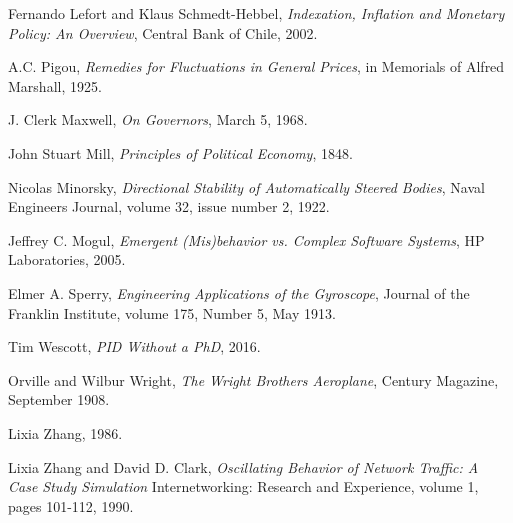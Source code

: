 \begin{thebibliography}{9}
    Fernando Lefort and Klaus Schmedt-Hebbel,
    \emph{Indexation, Inflation and Monetary Policy: An Overview},
    Central Bank of Chile,
    2002.

    A.C. Pigou,
    \emph{Remedies for Fluctuations in General Prices},
    in Memorials of Alfred Marshall,
    1925.

    J. Clerk Maxwell,
    \emph{On Governors},
    March 5, 1968.

    John Stuart Mill,
    \emph{Principles of Political Economy},
    1848.

    Nicolas Minorsky,
    \emph{Directional Stability of Automatically Steered Bodies},
    Naval Engineers Journal,
    volume 32,
    issue number 2,
    1922.

    Jeffrey C. Mogul,
    \emph{Emergent (Mis)behavior vs. Complex Software Systems},
    HP Laboratories,
    2005.

    Elmer A. Sperry,
    \emph{Engineering Applications of the Gyroscope},
    Journal of the Franklin Institute,
    volume 175,
    Number 5,
    May 1913.

    Tim Wescott,
    \emph{PID Without a PhD},
    2016.

    Orville and Wilbur Wright,
    \emph{The Wright Brothers Aeroplane},
    Century Magazine,
    September 1908.

    Lixia Zhang,
    1986.

    Lixia Zhang and David D. Clark,
    \emph{Oscillating Behavior of Network Traffic: A Case Study Simulation}
    Internetworking: Research and Experience,
    volume 1,
    pages 101-112,
    1990.

\end{thebibliography}

